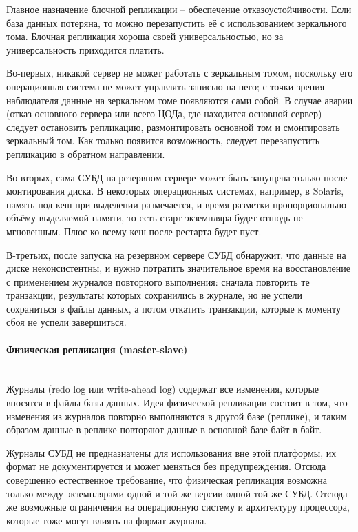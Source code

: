 Главное назначение блочной репликации – обеспечение отказоустойчивости. Если база данных потеряна, то можно
перезапустить её с использованием зеркального тома. Блочная репликация хороша своей универсальностью, но за
универсальность приходится платить.

Во-первых, никакой сервер не может работать с зеркальным томом, поскольку его операционная система не может управлять
записью на него; с точки зрения наблюдателя данные на зеркальном томе появляются сами собой. В случае аварии (отказ
основного сервера или всего ЦОДа, где находится основной сервер) следует остановить репликацию, размонтировать основной
том и смонтировать зеркальный том. Как только появится возможность, следует перезапустить репликацию в обратном
направлении.

Во-вторых, сама СУБД на резервном сервере может быть запущена только после монтирования диска. В некоторых операционных
системах, например, в Solaris, память под кеш при выделении размечается, и время разметки пропорционально объёму
выделяемой памяти, то есть старт экземпляра будет отнюдь не мгновенным. Плюс ко всему кеш после рестарта будет пуст.

В-третьих, после запуска на резервном сервере СУБД обнаружит, что данные на диске неконсистентны, и нужно потратить
значительное время на восстановление с применением журналов повторного выполнения: сначала повторить те транзакции,
результаты которых сохранились в журнале, но не успели сохраниться в файлы данных, а потом откатить транзакции, которые
к моменту сбоя не успели завершиться. \autocite{Replication}

\paragraph{Физическая репликация (master-slave)} ~\\
Журналы (redo log или write-ahead log) содержат все изменения, которые вносятся в файлы базы данных. Идея физической
репликации состоит в том, что изменения из журналов повторно выполняются в другой базе (реплике), и таким образом данные
в реплике повторяют данные в основной базе байт-в-байт.

Журналы СУБД не предназначены для использования вне этой платформы, их формат не документируется и может меняться без
предупреждения. Отсюда совершенно естественное требование, что физическая репликация возможна только между экземплярами
одной и той же версии одной той же СУБД. Отсюда же возможные ограничения на операционную систему и архитектуру
процессора, которые тоже могут влиять на формат журнала.

